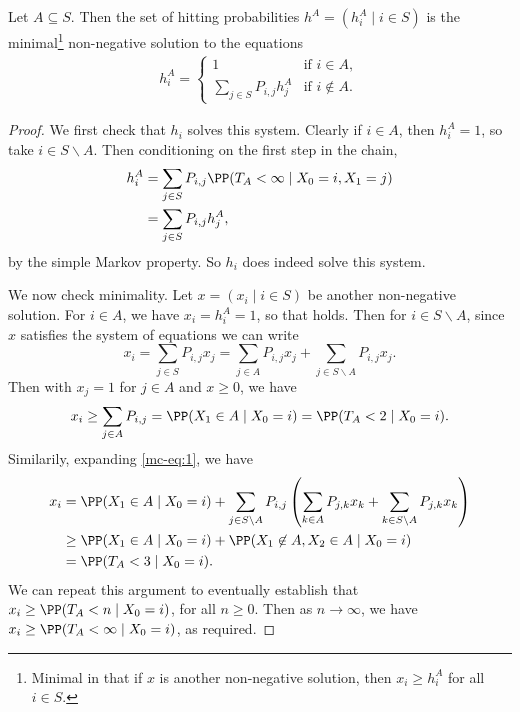 \begin{theorem}
	Let $A \subseteq S$. Then the set of hitting probabilities $h^A = (h_i^A \mid i \in S)$ is the minimal\footnote{Minimal in that if $x$ is another non-negative solution, then $x_i \geq h_i^A$ for all $i \in S$.} non-negative solution to the equations
	\begin{align*}
		h_i^A = \begin{cases}
			1 &\mbox{if } i  \in A, \\
			\sum_{j \in S} P_{i, j} h_j^A &\mbox{if } i \not \in A.
		   \end{cases}
	\end{align*}
\end{theorem}
\begin{proof}
	We first check that $h_i$ solves this system. Clearly if $i \in A$, then $h_i^A = 1$, so take $i \in S\backslash A$. Then conditioning on the first step in the chain,
	\begin{align*}
		h_i^A &= \sum_{j \in S} P_{i, j} \PP(T_A < \infty \mid X_0 = i, X_1 = j)  \\
		&= \sum_{j \in S} P_{i, j} h_j^A,
	\end{align*}
	by the simple Markov property. So $h_i$ does indeed solve this system.

	We now check minimality. Let $x = (x_i \mid i \in S)$ be another non-negative solution. For $i \in A$, we have $x_i = h^A_i = 1$, so that holds. Then for $i \in S \backslash A$, since $x$ satisfies the system of equations we can write
	\begin{equation}\label{mc-eq:1}
		x_i = \sum_{j \in S}P_{i, j} x_j = \sum_{j \in A} P_{i, j} x_j + \sum_{j \in S \backslash A} P_{i, j} x_j. \tag{$\dagger$}
	\end{equation}
	Then with $x_j = 1$ for $j \in A$ and $x \geq 0$, we have
	\begin{align*}
		x_i \geq \sum_{j \in A} P_{i, j} = \PP(X_1 \in A \mid X_0 = i) = \PP(T_A < 2 \mid X_0 = i).
	\end{align*}
	Similarily, expanding \eqref{mc-eq:1}, we have
	\begin{align*}
	x_i &= \PP(X_1 \in A \mid X_0 = i) + \sum_{j \in S \backslash A} P_{i, j} \left(\sum_{k \in A} P_{j, k} x_k + \sum_{k \in S \backslash A} P_{j, k} x_k\right) \\
		&\geq \PP(X_1 \in A \mid X_0 = i) + \PP(X_1 \not \in A, X_2 \in A \mid X_0 = i) \\
		&= \PP(T_A < 3 \mid X_0 = i).
	\end{align*}
	We can repeat this argument to eventually establish that $x_i \geq \PP(T_A < n \mid X_0 = i)$, for all $n \geq 0$. Then as $n \rightarrow \infty$, we have $x_i \geq \PP(T_A < \infty \mid X_0 = i)$, as required.
\end{proof}

